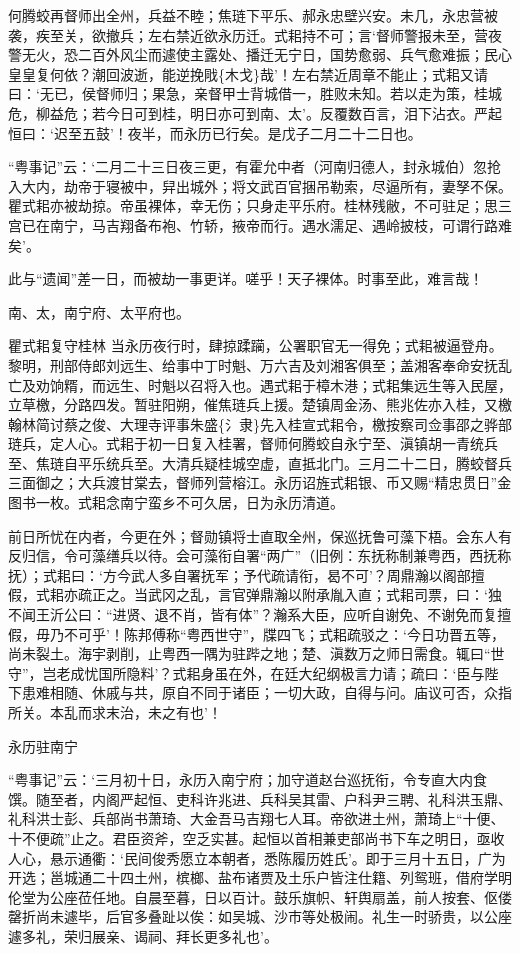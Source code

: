 \documentclass[]{article}
\begin{document}
何腾蛟再督师出全州，兵益不睦；焦琏下平乐、郝永忠壁兴安。未几，永忠营被袭，疾至关，欲撤兵；左右禁近欲永历迁。式耜持不可；言`督师警报未至，营夜警无火，恐二百外风尘而遽使主露处、播迁无宁日，国势愈弱、兵气愈难振；民心皇皇复何依？潮回波逝，能逆挽戙\{木戈\}哉'！左右禁近周章不能止；式耜又请曰：`无已，侯督师归；果急，亲督甲士背城借一，胜败未知。若以走为策，桂城危，柳益危；若今日可到桂，明日亦可到南、太'。反覆数百言，泪下沾衣。严起恒曰：`迟至五鼓'！夜半，而永历已行矣。是戊子二月二十二日也。

``粤事记''云：`二月二十三日夜三更，有霍允中者（河南归德人，封永城伯）忽抢入大内，劫帝于寝被中，舁出城外；将文武百官捆吊勒索，尽逼所有，妻孥不保。瞿式耜亦被劫掠。帝虽裸体，幸无伤；只身走平乐府。桂林残敝，不可驻足；思三宫已在南宁，马吉翔备布袍、竹轿，掖帝而行。遇水濡足、遇岭披枝，可谓行路难矣'。

此与``遗闻''差一日，而被劫一事更详。嗟乎！天子裸体。时事至此，难言哉！

南、太，南宁府、太平府也。

瞿式耜复守桂林
当永历夜行时，肆掠蹂躏，公署职官无一得免；式耜被逼登舟。黎明，刑部侍郎刘远生、给事中丁时魁、万六吉及刘湘客俱至；盖湘客奉命安抚乱亡及劝饷糈，而远生、时魁以召将入也。遇式耜于樟木港；式耜集远生等入民屋，立草檄，分路四发。暂驻阳朔，催焦琏兵上援。楚镇周金汤、熊兆佐亦入桂，又檄翰林简讨蔡之俊、大理寺评事朱盛\{氵隶\}先入桂宣式耜令，檄按察司佥事邵之骅部琏兵，定人心。式耜于初一日复入桂署，督师何腾蛟自永宁至、滇镇胡一青统兵至、焦琏自平乐统兵至。大清兵疑桂城空虚，直抵北门。三月二十二日，腾蛟督兵三面御之；大兵渡甘棠去，督师列营榕江。永历诏旌式耜银、币又赐``精忠贯日''金图书一枚。式耜念南宁蛮乡不可久居，日为永历清道。

前日所忧在内者，今更在外；督勋镇将士直取全州，保巡抚鲁可藻下梧。会东人有反归信，令可藻缮兵以待。会可藻衔自署``两广''（旧例：东抚称制兼粤西，西抚称抚）；式耜曰：`方今武人多自署抚军；予代疏请衔，曷不可'？周鼎瀚以阁部擅假，式耜亦疏正之。当武冈之乱，言官弹鼎瀚以附承胤入直；式耜司票，曰：`独不闻王沂公曰：``进贤、退不肖，皆有体''？瀚系大臣，应听自谢免、不谢免而复擅假，毋乃不可乎'！陈邦傅称``粤西世守''，牒四飞；式耜疏驳之：`今日功晋五等，尚未裂土。海宇剥削，止粤西一隅为驻跸之地；楚、滇数万之师日需食。辄曰``世守''，岂老成忧国所隐料'？式耜身虽在外，在廷大纪纲极言力请；疏曰：`臣与陛下患难相随、休戚与共，原自不同于诸臣；一切大政，自得与问。庙议可否，众指所关。本乱而求末治，未之有也'！

永历驻南宁

``粤事记''云：`三月初十日，永历入南宁府；加守道赵台巡抚衔，令专直大内食馔。随至者，内阁严起恒、吏科许兆进、兵科吴其雷、户科尹三聘、礼科洪玉鼎、礼科洪士彭、兵部尚书萧琦、大金吾马吉翔七人耳。帝欲进土州，萧琦上``十便、十不便疏''止之。君臣资斧，空乏实甚。起恒以首相兼吏部尚书下车之明日，亟收人心，悬示通衢：`民间俊秀愿立本朝者，悉陈履历姓氏'。即于三月十五日，广为开选；邕城通二十四土州，槟榔、盐布诸贾及土乐户皆注仕籍、列鸳班，借府学明伦堂为公座莅任地。自晨至暮，日以百计。鼓乐旗帜、轩舆扇盖，前人按套、伛偻罄折尚未遽毕，后官多叠趾以俟：如吴城、沙市等处极闹。礼生一时骄贵，以公座遽多礼，荣归展亲、谒祠、拜长更多礼也'。
\end{document}
